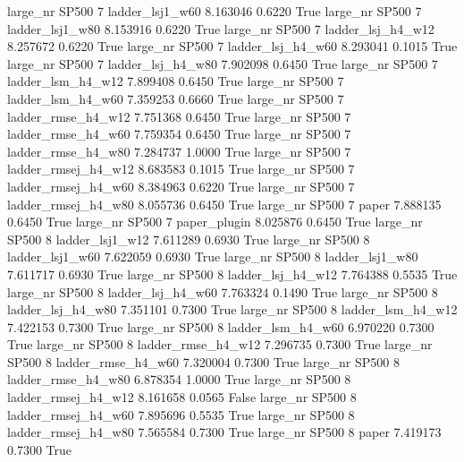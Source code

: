   large_nr    SP500                 7     ladder_lsj1_w60   8.163046      0.6220    True
  large_nr    SP500                 7     ladder_lsj1_w80   8.153916      0.6220    True
  large_nr    SP500                 7   ladder_lsj_h4_w12   8.257672      0.6220    True
  large_nr    SP500                 7   ladder_lsj_h4_w60   8.293041      0.1015    True
  large_nr    SP500                 7   ladder_lsj_h4_w80   7.902098      0.6450    True
  large_nr    SP500                 7   ladder_lsm_h4_w12   7.899408      0.6450    True
  large_nr    SP500                 7   ladder_lsm_h4_w60   7.359253      0.6660    True
  large_nr    SP500                 7  ladder_rmse_h4_w12   7.751368      0.6450    True
  large_nr    SP500                 7  ladder_rmse_h4_w60   7.759354      0.6450    True
  large_nr    SP500                 7  ladder_rmse_h4_w80   7.284737      1.0000    True
  large_nr    SP500                 7 ladder_rmsej_h4_w12   8.683583      0.1015    True
  large_nr    SP500                 7 ladder_rmsej_h4_w60   8.384963      0.6220    True
  large_nr    SP500                 7 ladder_rmsej_h4_w80   8.055736      0.6450    True
  large_nr    SP500                 7               paper   7.888135      0.6450    True
  large_nr    SP500                 7        paper_plugin   8.025876      0.6450    True
  large_nr    SP500                 8     ladder_lsj1_w12   7.611289      0.6930    True
  large_nr    SP500                 8     ladder_lsj1_w60   7.622059      0.6930    True
  large_nr    SP500                 8     ladder_lsj1_w80   7.611717      0.6930    True
  large_nr    SP500                 8   ladder_lsj_h4_w12   7.764388      0.5535    True
  large_nr    SP500                 8   ladder_lsj_h4_w60   7.763324      0.1490    True
  large_nr    SP500                 8   ladder_lsj_h4_w80   7.351101      0.7300    True
  large_nr    SP500                 8   ladder_lsm_h4_w12   7.422153      0.7300    True
  large_nr    SP500                 8   ladder_lsm_h4_w60   6.970220      0.7300    True
  large_nr    SP500                 8  ladder_rmse_h4_w12   7.296735      0.7300    True
  large_nr    SP500                 8  ladder_rmse_h4_w60   7.320004      0.7300    True
  large_nr    SP500                 8  ladder_rmse_h4_w80   6.878354      1.0000    True
  large_nr    SP500                 8 ladder_rmsej_h4_w12   8.161658      0.0565   False
  large_nr    SP500                 8 ladder_rmsej_h4_w60   7.895696      0.5535    True
  large_nr    SP500                 8 ladder_rmsej_h4_w80   7.565584      0.7300    True
  large_nr    SP500                 8               paper   7.419173      0.7300    True
